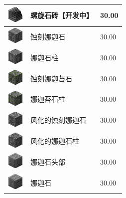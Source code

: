 \documentclass[UTF8]{ctexart}
\begin{document}
\begin{longtable}[]{|p{1cm}|p{8cm}|p{1.5cm}|}
	\hline
	\includegraphics{.workspace/icons/twilightforest/twilightforest__spiral_bricks__0.png} & 螺旋石砖【开发中】 &30.00\\
	\hline
	\includegraphics{.workspace/icons/twilightforest/twilightforest__etched_nagastone__0.png} & 蚀刻娜迦石 &30.00\\
	\hline
	\includegraphics{.workspace/icons/twilightforest/twilightforest__nagastone_pillar__0.png} & 娜迦石柱 &30.00\\
	\hline
	\includegraphics{.workspace/icons/twilightforest/twilightforest__etched_nagastone_mossy__0.png} & 蚀刻娜迦苔石 &30.00\\
	\hline
	\includegraphics{.workspace/icons/twilightforest/twilightforest__nagastone_pillar_mossy__0.png} & 娜迦苔石柱 &30.00\\
	\hline
	\includegraphics{.workspace/icons/twilightforest/twilightforest__etched_nagastone_weathered__0.png} & 风化的蚀刻娜迦石 &30.00\\
	\hline
	\includegraphics{.workspace/icons/twilightforest/twilightforest__nagastone_pillar_weathered__0.png} & 风化的娜迦石柱 &30.00\\
	\hline
	\includegraphics{.workspace/icons/twilightforest/twilightforest__naga_stone__0.png} & 娜迦石头部 &30.00\\
	\hline
	\includegraphics{.workspace/icons/twilightforest/twilightforest__naga_stone__1.png} & 娜迦石 &30.00\\

\end{longtable}
\end{document}
